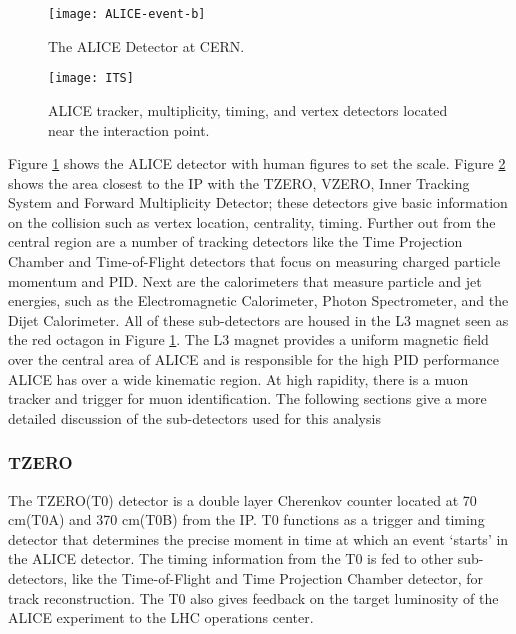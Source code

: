 \begin{figure}[h!]
\texttt{[image: ALICE-event-b]}
\centering
\caption{The ALICE Detector at CERN\cite{Alberico:2011zy}.}
 \label{fig:alice}
\end{figure}

\begin{figure}[h!]
\texttt{[image: ITS]}
\centering
\caption{ALICE tracker, multiplicity, timing, and vertex detectors located near the interaction point\cite{Alberico:2011zy}.}
 \label{fig:ITS}
\end{figure}

\noindent
Figure \ref{fig:alice} shows the ALICE detector with human figures to set the scale.  Figure \ref{fig:ITS} shows the area closest to the IP with the TZERO, VZERO, Inner Tracking System and Forward Multiplicity Detector; these detectors give basic information on the collision such as vertex location, centrality, timing.   Further out from the central region are a number of tracking detectors like the Time Projection Chamber and Time-of-Flight detectors that focus on  measuring charged particle momentum and PID.  Next are the calorimeters that measure particle and jet energies, such as the Electromagnetic Calorimeter, Photon Spectrometer, and the Dijet Calorimeter.  All of these sub-detectors are housed in the L3 magnet seen as the red octagon in Figure \ref{fig:alice}.   The L3 magnet provides a uniform magnetic field over the central area of ALICE and is responsible for the high PID performance ALICE has over a wide kinematic region\cite{Gligorov:2018vkc}.  At high rapidity, there is a muon tracker and trigger for muon identification.  The following sections give a more detailed discussion of the sub-detectors used for this analysis

\subsubsection{TZERO}
The TZERO(T0)\cite{Bondila:2005xy} detector is a double layer Cherenkov counter located at 70 cm(T0A) and 370 cm(T0B) from the IP.  T0 functions as a trigger and timing detector that determines the precise moment in time at which an event `starts' in the ALICE detector.  The timing information from the T0 is fed to other sub-detectors, like the Time-of-Flight and Time Projection Chamber detector, for track reconstruction.  The T0 also gives feedback on the target luminosity of the ALICE experiment to the LHC operations center.  

